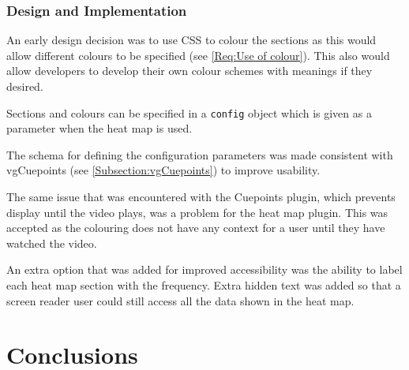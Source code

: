 \subsubsection{Design and Implementation}
An early design decision was to use \gls{CSS} to colour the sections as this would allow different colours to be specified (see \cref{Req:Use of colour}). This also would allow developers to develop their own colour schemes with meanings if they desired.

Sections and colours can be specified in a \texttt{config} object which is given as a parameter when the heat map is used. 

The schema for defining the configuration parameters was made consistent with vgCuepoints (see \autoref{Subsection:vgCuepoints}) to improve usability.

The same issue that was encountered with the Cuepoints plugin, which prevents display until the video plays, was a problem for the heat map plugin. This was accepted as the colouring does not have any context for a user until they have watched the video.

An extra option that was added for improved accessibility was the ability to label each heat map section with the frequency. Extra hidden text was added so that a screen reader user could still access all the data shown in the heat map. 

\section{Conclusions} 
